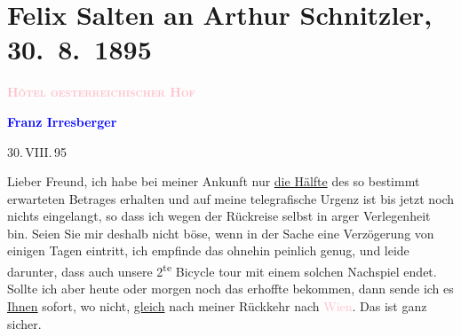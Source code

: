 

\renewcommand{\erwaehntePersonen}{Personen: Lou Andreas-Salomé, Richard Beer-Hofmann, Siegfried Bing, Emma Fr., Vincent van Gogh, Paul Goldmann, Franz Irresberger, Karl Kraus, Charlotte Pohl-Glas, Adele Sandrock}
\renewcommand{\erwaehnteOrte}{Orte: Asien, Bad Ischl, Gmunden, Japan, München, Paris, Salzburg, Wien, Österreichischer Hof}
\renewcommand{\erwaehnteWerke}{Werke: Ischler Brief. (Wiener Dichter auf der Esplanade.), Wiener Familien-Journal}
\section[Felix Salten an Arthur Schnitzler, 30. 8. 1895]{Felix Salten an Arthur Schnitzler, 30. 8. 1895}
\nopagebreak{}
\rehead{ }\normalsize\beginnumbering{}
\toendnotes[C]{\smallbreak\pagebreak[2]}
\toendnotes[C]{\smallbreak}
\pstart
           \noindent{}\centering{}{\pb}\textcolor{gray}{\textbf{\textsc{\textcolor{pink}{Hôtel oesterreichischer Hof}{}\ledrightnote{\textcolor{pink}{Österreichischer Hof}}}}}\pend
           
\pstart
           \noindent{}\centering{}\textcolor{gray}{\textbf{\textcolor{blue}{Franz Irresberger}{}\ledrightnote{\textcolor{blue}{Franz Irresberger}}}}\pend
           
\pstart
           \raggedleft{}30. VIII. 95\pend
           
\pstart
           Lieber Freund, ich habe bei meiner Ankunft nur \uline{die Hälfte} des so bestimmt erwarteten Betrages erhalten und auf meine
               telegrafische Urgenz ist bis jetzt noch nichts eingelangt, so dass ich wegen der
               Rückreise selbst in arger Verlegenheit bin. Seien Sie mir deshalb nicht böse, wenn in
               der Sache eine Verzögerung von einigen Tagen eintritt, ich empfinde das ohnehin
               peinlich genug, und leide darunter, dass auch unsere 2\textsuperscript{te}
               Bicycle tour mit einem solchen Nachspiel endet. Sollte ich aber heute oder
                  morgen noch das erhoffte bekommen, dann sende ich es \uline{Ihnen} sofort, wo nicht, \uline{gleich} nach meiner Rückkehr nach \textcolor{pink}{Wien}{}\ledrightnote{\textcolor{pink}{Wien}}.
               Das ist ganz sicher. \pend
           

